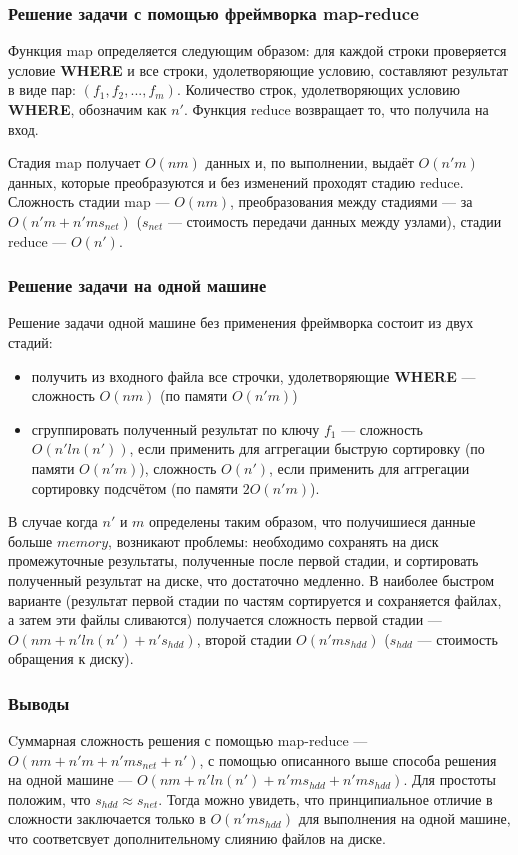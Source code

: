 \documentclass[12pt,a4paper,oneside]{extarticle}
\begin{document}
        \subsubsection{Решение задачи с помощью фреймворка map-reduce}
            
            Функция map определяется следующим образом: для каждой строки проверяется условие {\bf WHERE} и все строки, удолетворяющие условию, составляют результат в виде пар: $(f_1, f_2, ..., f_m)$. Количество строк, удолетворяющих условию {\bf WHERE}, обозначим как $n'$. Функция reduce возвращает то, что получила на вход.

            Стадия map получает $O(nm)$ данных и, по выполнении, выдаёт $O(n'm)$ данных, которые преобразуются и без изменений проходят стадию reduce. Сложность стадии map --- $O(nm)$, преобразования между стадиями --- за $O(n'm+n'ms_{net})$ ($s_{net}$ --- стоимость передачи данных между узлами), стадии reduce --- $O(n')$. 

        \subsubsection{Решение задачи на одной машине}
            Решение задачи одной машине без применения фреймворка состоит из двух стадий: 
            \begin{itemize}
                \item получить из входного файла все строчки, удолетворяющие {\bf WHERE} --- сложность $O(nm)$ (по памяти $O(n'm)$)
                \item сгруппировать полученный результат по ключу $f_1$ --- сложность $O(n'ln(n'))$, если применить для аггрегации быструю сортировку (по памяти $O(n'm)$), сложность $O(n')$, если применить для аггрегации сортировку подсчётом (по памяти $2O(n'm)$).
            \end{itemize}

            В случае когда $n'$ и $m$ определены таким образом, что получишиеся данные больше $memory$, возникают проблемы: необходимо сохранять на диск промежуточные результаты, полученные после первой стадии, и сортировать полученный результат на диске, что достаточно медленно. В наиболее быстром варианте (результат первой стадии по частям сортируется и сохраняется файлах, а затем эти файлы сливаются) получается сложность первой стадии --- $O(nm + n'ln(n') + n's_{hdd})$, второй стадии $O(n'ms_{hdd})$ ($s_{hdd}$ --- стоимость обращения к диску).

        \subsubsection{Выводы}
            Cуммарная сложность решения с помощью map-reduce --- $O(nm+n'm+n'ms_{net}+n')$, с помощью описанного выше способа решения на одной машине --- $O(nm + n'ln(n') + n'ms_{hdd}+n'ms_{hdd})$. Для простоты положим, что $s_{hdd} \approx s_{net}$. Тогда можно увидеть, что принципиальное отличие в сложности заключается только в $O(n'ms_{hdd})$ для выполнения на одной машине, что соответсвует дополнительному слиянию файлов на диске.
\end{document}
